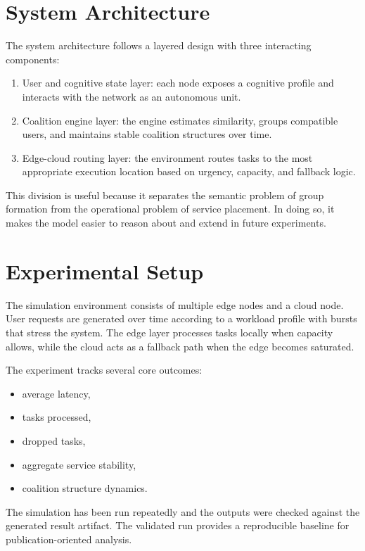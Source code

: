 \documentclass[11pt]{article}
\begin{document}
\section{System Architecture}
The system architecture follows a layered design with three interacting components:

\begin{enumerate}[leftmargin=2em]
    \item User and cognitive state layer: each node exposes a cognitive profile and interacts with the network as an autonomous unit.
    \item Coalition engine layer: the engine estimates similarity, groups compatible users, and maintains stable coalition structures over time.
    \item Edge-cloud routing layer: the environment routes tasks to the most appropriate execution location based on urgency, capacity, and fallback logic.
\end{enumerate}

This division is useful because it separates the semantic problem of group formation from the operational problem of service placement. In doing so, it makes the model easier to reason about and extend in future experiments.

\section{Experimental Setup}
The simulation environment consists of multiple edge nodes and a cloud node. User requests are generated over time according to a workload profile with bursts that stress the system. The edge layer processes tasks locally when capacity allows, while the cloud acts as a fallback path when the edge becomes saturated.

The experiment tracks several core outcomes:

\begin{itemize}
    \item average latency,
    \item tasks processed,
    \item dropped tasks,
    \item aggregate service stability,
    \item coalition structure dynamics.
\end{itemize}

The simulation has been run repeatedly and the outputs were checked against the generated result artifact. The validated run provides a reproducible baseline for publication-oriented analysis.
\end{document}
